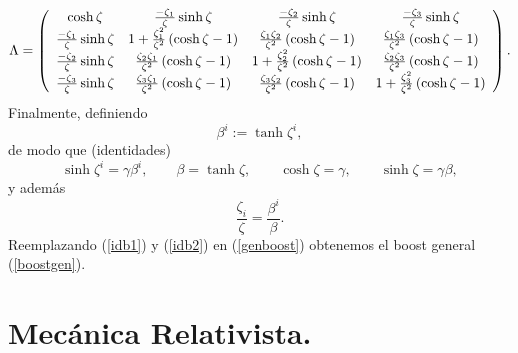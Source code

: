 \begin{equation}
\Lambda=\left(
\begin{array}
[c]{cccc}
\cosh\zeta & \frac{-\zeta_1}{\zeta}\sinh\zeta & \frac
{-\zeta_2}{\zeta}\sinh\zeta & \frac{-\zeta_3}{\zeta
}\sinh\zeta\\
\frac{-\zeta_1}{\zeta}\sinh\zeta & 1+\frac{\zeta_1^2}{\zeta^2}\left(  \cosh\zeta-1\right)  & \frac{\zeta_1\zeta_2}{\zeta
^2}\left(  \cosh\zeta-1\right)  & \frac{\zeta_1\zeta_3}{\zeta^2}\left(  \cosh\zeta-1\right) \\
\frac{-\zeta_2}{\zeta}\sinh\zeta & \frac{\zeta_2\zeta_1}{\zeta^2}\left(  \cosh\zeta-1\right)  & 1+\frac{\zeta_2^2}{\zeta^2}\left(  \cosh\zeta-1\right)  & \frac{\zeta_2\zeta_3}{\zeta^2}\left(
\cosh\zeta-1\right) \\
\frac{-\zeta_3}{\zeta}\sinh\zeta & \frac{\zeta_3\zeta_1}{\zeta^2}\left(  \cosh\zeta-1\right)  & \frac{\zeta_3\zeta_2}{\zeta
^2}\left(  \cosh\zeta-1\right)  & 1+\frac{\zeta_3^2}{\zeta^2}\left(
\cosh\zeta-1\right) \label{genboost}
\end{array}
\right).
\end{equation}
Finalmente, definiendo
\begin{equation}
\beta^i :=\tanh\zeta^i,
\end{equation}
de modo que (identidades)
\begin{equation}
\sinh\zeta^i =\gamma\beta^i, \qquad \beta   =\tanh\zeta, \qquad
\cosh\zeta  =\gamma, \qquad \sinh\zeta  =\gamma\beta, \label{idb1}
\end{equation}
y además
\begin{equation}
\frac{\zeta_i}{\zeta}=\frac{\beta^i}{\beta}. \label{idb2}
\end{equation}
Reemplazando (\ref{idb1}) y (\ref{idb2}) en (\ref{genboost}) obtenemos el boost general (\ref{boostgen}).


\section{Mecánica Relativista.}
